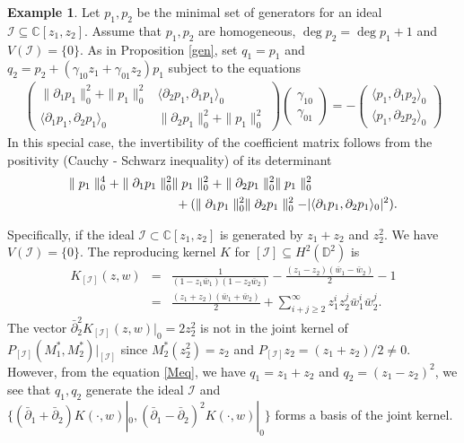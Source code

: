 \documentclass[11pt]{amsart}
\theoremstyle{definition}
\newtheorem{ex}[thm]{Example}
\numberwithin{equation}{section}
\begin{document}
\begin{ex}\label{ke} Let $p_1, p_2$ be the minimal set of generators for an ideal $\mathcal I \subseteq \mathbb C[z_1,z_2]$.  Assume that $p_1,p_2$ are homogeneous, $\deg p_2 = \deg p_1 +1$ and $V(\mathcal I) =\{0\}$. As in Proposition \ref{gen}, set $q_1=p_1$ and $q_2 = p_2 + (\gamma_{10}z_1 + \gamma_{01} z_2) p_1$ subject to the equations
 \begin{eqnarray} \label{Meq}\left(\begin{array}{ll}
\parallel\partial_1 p_1\parallel_0^2+\parallel p_1\parallel^2_0 & \langle \partial_2 p_1,\partial_1 p_1\rangle_0 \\
\langle \partial_1 p_1,\partial_2 p_1\rangle_0 & \parallel\partial_2 p_1\parallel_0^2+\parallel p_1\parallel^2_0   \end{array}\right) \left(\begin{array}{l}
 \gamma_{10}\\
\gamma_{01}
  \end{array}\right)
= - \left(\begin{array}{l}
 \langle p_1, \partial_1
p_2\rangle_0\\ \langle p_1,
\partial_2 p_2\rangle_0
  \end{array}\right)
\end{eqnarray}  
In this special case, the invertibility of the coefficient matrix follows from the positivity (Cauchy -  Schwarz inequality) of its  determinant  
\begin{eqnarray*} \lefteqn{\parallel p_1\parallel^4_0+
\parallel\partial_1 p_1\parallel_0^2\parallel p_1\parallel^2_0+\parallel\partial_2 p_1\parallel_0^2\parallel p_1\parallel^2_0}\\ && \phantom{AAAAAAAAAA}+ (\parallel \partial_1 p_1\parallel_0^2 \parallel \partial_2 p_1\parallel_0^2 - |\langle \partial_1 p_1,\partial_2 p_1\rangle_0|^2).
\end{eqnarray*}

Specifically, if the ideal  $\mathcal I\subset {{\mathbb C}}[z_1,z_2]$ is generated by $z_1+z_2$ and $z_2^2$. We have $V(\mathcal I)=\{0\}$. The reproducing kernel $K$ for $[\mathcal I]\subseteq H^2(\mathbb D^2)$ is 
\begin{eqnarray*}
K_{[\mathcal I]}(z,w)&=&\frac{1}{(1-z_1\bar w_1)(1-z_2\bar
w_2)}-\frac{(z_1-z_2)(\bar w_1 - \bar w_2)}{ 2} - 1\\
&=&\frac{(z_1 + z_2)(\bar w_1 + \bar w_2)}{ 2}+{\sum}_{i+j\geq2}^\infty
z_1^iz_2^j\bar w_1^i\bar w_2^j.
\end{eqnarray*} 
The vector $\bar\partial_2^2K_{[\mathcal I]}(z,w)|_0= 2z_2^2$ is not in the joint kernel of $P_{[\mathcal I]}(M_1^*,M_2^*)|_{[\mathcal I]}$ since 
$M_2^*(z_2^2)= z_2$ and $P_{[\mathcal I]} z_2 = (z_1 + z_2)/2 \neq 0$. However, from the equation \eqref{Meq},  
we have $q_1=z_1+z_2$ and $q_2 = (z_1 - z_2)^2$,  we see that $q_1, q_2$ generate the ideal $\mathcal I$ and
$\{(\bar\partial_1+\bar\partial_2)K(\cdot,w)|_0,(\bar\partial_1-\bar\partial_2)^2K(\cdot,w)|_0\}$ forms a basis of the joint kernel. 

\end{ex}
\end{document}
